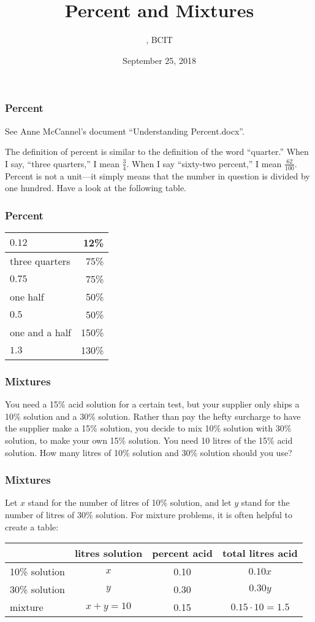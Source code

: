 \documentclass[xcolor=dvipsnames]{beamer}
\title{Percent and Mixtures}
\subtitle{{\CourseNumber}, BCIT}
\author{\CourseName}
\date{September 25, 2018}
\begin{document}
\begin{frame}
  \titlepage
\end{frame}

\begin{frame}
  \frametitle{Percent}
See Anne McCannel's document ``Understanding Percent.docx''.

The definition of percent is similar to the definition of the word
``quarter.'' When I say, ``three quarters,'' I mean $\frac{3}{4}$.
When I say ``sixty-two percent,'' I mean $\frac{62}{100}$. Percent is
not a unit---it simply means that the number in question is divided by
one hundred. Have a look at the following table.
\end{frame}

\begin{frame}
  \frametitle{Percent}
\begin{tabular}{|l|r|}\hline
  $0.12$ & 12\% \\ \hline
  three quarters & 75\% \\ \hline
  $0.75$ & 75\% \\ \hline
  one half & 50\% \\ \hline
  $0.5$ & 50\% \\ \hline
  one and a half & 150\% \\ \hline
  $1.3$ & 130\% \\ \hline
\end{tabular}
\end{frame}

\begin{frame}
  \frametitle{Mixtures}
  You need a 15\% acid solution for a certain test, but your supplier
  only ships a 10\% solution and a 30\% solution. Rather than pay the
  hefty surcharge to have the supplier make a 15\% solution, you
  decide to mix 10\% solution with 30\% solution, to make your own
  15\% solution. You need 10 litres of the 15\% acid solution. How
  many litres of 10\% solution and 30\% solution should you use?
\end{frame}

\begin{frame}
  \frametitle{Mixtures}
  Let $x$ stand for the number of litres of 10\% solution, and let $y$
  stand for the number of litres of 30\% solution. For mixture
  problems, it is often helpful to create a table:

  \bigskip

  \begin{tabular}{|l|c|c|c|}\hline
    & litres solution & percent acid & total litres acid \\ \hline
    10\% solution & $x$ & 0.10 & $0.10x$ \\ \hline
    30\% solution & $y$ & 0.30 & $0.30y$ \\ \hline
    mixture & $x+y=10$ & 0.15 & $0.15\cdot{}10=1.5$ \\ \hline
  \end{tabular}
\end{frame}
\end{document}
